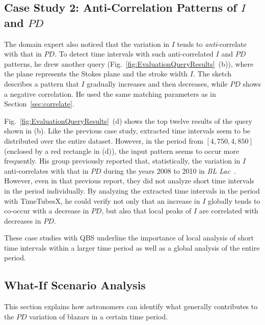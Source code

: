 %
\subsection{Case Study 2: Anti-Correlation Patterns of $I$ and $PD$}\label{sec:anticorrelate}
The domain expert also noticed that the variation in $I$ tends to \emph{anti}-correlate with that in $PD$. %
To detect time intervals with such anti-correlated $I$ and $PD$ patterns, he drew another query (Fig.~\ref{fig:EvaluationQueryResults}~(b)),
where the plane represents the Stokes plane and the stroke width $I$.
The sketch describes a pattern that $I$ gradually increases and then decreases, while $PD$ shows a negative correlation. %
He used the same matching parameters as in Section~\ref{sec:correlate}.

Fig.~\ref{fig:EvaluationQueryResults}~(d) shows the top twelve results of the query shown in (b).
Like the previous case study, 
extracted time intervals seem to be distributed over the entire dataset. %
However, in the period from $[4{,}750, 4{,}850]$ (enclosed by a red rectangle in (d)), 
the input pattern seems to occur more frequently.
His group previously reported that, statistically, the variation in $I$ anti-correlates with that in $PD$ during the years 2008 to 2010 in \emph{BL Lac}~\cite{Gaur2014}.
However, even in that previous report, they did not analyze short time intervals in the period individually.
By analyzing the extracted time intervals in the period with TimeTubesX, he could verify not only that an increase in $I$ globally tends to co-occur with a decrease in $PD$, 
but also that local peaks of $I$ are correlated with decreases in $PD$.

These case studies with QBS underline the importance of local analysis of short time intervals within a larger time period as well as a global analysis of the entire period.

%
%
\subsection{What-If Scenario Analysis}
This section explains how astronomers can identify what generally contributes to the $PD$ variation of blazars in a certain time period. 


